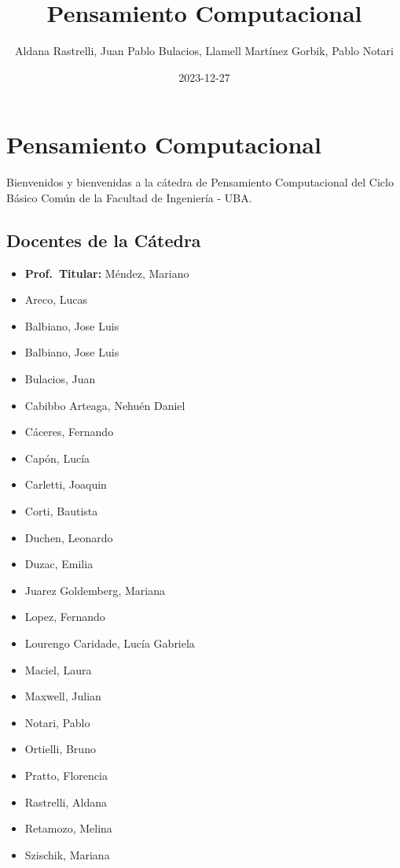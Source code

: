 \documentclass[
  letterpaper,
  DIV=11,
  numbers=noendperiod]{scrreprt}
\title{Pensamiento Computacional}
\author{Aldana Rastrelli, Juan Pablo Bulacios, Llamell Martínez Gorbik,
Pablo Notari}
\date{2023-12-27}
\renewcommand*\contentsname{Table of contents}
\newcommand\contentsname{Table of contents}
\begin{document}
\maketitle

\renewcommand*\contentsname{Table of contents}
{
\hypersetup{linkcolor=}
\setcounter{tocdepth}{2}
\tableofcontents
}


\chapter*{Pensamiento Computacional}\label{pensamiento-computacional}


Bienvenidos y bienvenidas a la cátedra de Pensamiento Computacional del
Ciclo Básico Común de la Facultad de Ingeniería - UBA.

\section*{Docentes de la Cátedra}\label{docentes-de-la-cuxe1tedra}


\begin{itemize}
\item
  \textbf{Prof.~Titular:} Méndez, Mariano
\item
  Areco, Lucas
\item
  Balbiano, Jose Luis
\item
  Balbiano, Jose Luis
\item
  Bulacios, Juan
\item
  Cabibbo Arteaga, Nehuén Daniel
\item
  Cáceres, Fernando
\item
  Capón, Lucía
\item
  Carletti, Joaquin
\item
  Corti, Bautista
\item
  Duchen, Leonardo
\item
  Duzac, Emilia
\item
  Juarez Goldemberg, Mariana
\item
  Lopez, Fernando
\item
  Lourengo Caridade, Lucía Gabriela
\item
  Maciel, Laura
\item
  Maxwell, Julian
\item
  Notari, Pablo
\item
  Ortielli, Bruno
\item
  Pratto, Florencia
\item
  Rastrelli, Aldana
\item
  Retamozo, Melina
\item
  Szischik, Mariana
\end{itemize}
\end{document}
